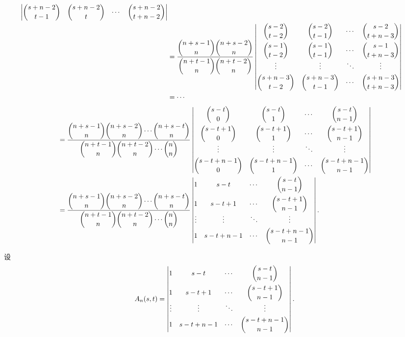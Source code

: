 \documentclass[color=black,device=normal,lang=cn,mode=geye]{elegantnote}
\begin{document}
\begin{landscape}
\begin{solution}
\begin{align*}
\begin{vmatrix}
            \dbinom{s+n-2}{t-1} & \dbinom{s+n-2}{t} & \cdots & \dbinom{s+n-2}{t+n-2} \\
        \end{vmatrix} \\
        & =\dfrac{\dbinom{n+s-1}{n}\dbinom{n+s-2}{n}}{\dbinom{n+t-1}{n}\dbinom{n+t-2}{n}}\begin{vmatrix}
            \dbinom{s-2}{t-2} & \dbinom{s-2}{t-1} & \cdots & \dbinom{s-2}{t+n-3} \\[10pt]
            \dbinom{s-1}{t-2} & \dbinom{s-1}{t-1} & \cdots & \dbinom{s-1}{t+n-3} \\
            \vdots & \vdots & \ddots & \vdots \\[4pt]
            \dbinom{s+n-3}{t-2} & \dbinom{s+n-3}{t-1} & \cdots & \dbinom{s+n-3}{t+n-3} \\
        \end{vmatrix} \\
        & =\cdots
    \end{align*}
    \begin{align*}
        & =\dfrac{\dbinom{n+s-1}{n}\dbinom{n+s-2}{n}\cdots\dbinom{n+s-t}{n}}{\dbinom{n+t-1}{n}\dbinom{n+t-2}{n}\cdots\dbinom{n}{n}}\begin{vmatrix}
            \dbinom{s-t}{0} & \dbinom{s-t}{1} & \cdots & \dbinom{s-t}{n-1} \\[10pt]
            \dbinom{s-t+1}{0} & \dbinom{s-t+1}{1} & \cdots & \dbinom{s-t+1}{n-1} \\
            \vdots & \vdots & \ddots & \vdots \\[4pt]
            \dbinom{s-t+n-1}{0} & \dbinom{s-t+n-1}{1} & \cdots & \dbinom{s-t+n-1}{n-1} \\
        \end{vmatrix} \\
        & =\dfrac{\dbinom{n+s-1}{n}\dbinom{n+s-2}{n}\cdots\dbinom{n+s-t}{n}}{\dbinom{n+t-1}{n}\dbinom{n+t-2}{n}\cdots\dbinom{n}{n}}\begin{vmatrix}
            1 & s-t & \cdots & \dbinom{s-t}{n-1} \\[10pt]
            1 & s-t+1 & \cdots & \dbinom{s-t+1}{n-1} \\
            \vdots & \vdots & \ddots & \vdots \\[4pt]
            1 & s-t+n-1 & \cdots & \dbinom{s-t+n-1}{n-1} \\
        \end{vmatrix}.
    \end{align*}
    
    设
    \[A_n(s,t)=\begin{vmatrix}
        1 & s-t & \cdots & \dbinom{s-t}{n-1} \\[10pt]
        1 & s-t+1 & \cdots & \dbinom{s-t+1}{n-1} \\
        \vdots & \vdots & \ddots & \vdots \\[4pt]
        1 & s-t+n-1 & \cdots & \dbinom{s-t+n-1}{n-1} \\
    \end{vmatrix}.\]
    

\end{solution}
\end{landscape}
\end{document}

